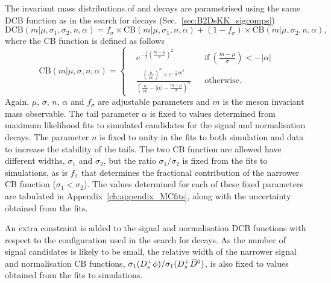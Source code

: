 The invariant mass distributions of \decay{\Bp}{\Dsp\phiz} and \decay{\Bp}{\Dsp\Dzb} decays are parametrised using the same DCB function as in the search for \decay{\Bp}{\Dsp\Kp\Km} decays (Sec.~\ref{sec:B2DsKK_sigcomps})
\begin{equation}
\text{DCB}(m|\mu,\sigma_1,\sigma_2,n,\alpha) = f_\sigma \times \text{CB}(m|\mu,\sigma_1,n,\alpha) + (1-f_\sigma) \times \text{CB}(m|\mu,\sigma_2,n,\alpha),
\label{eq:DoubleBD}
\end{equation}
where the CB function is defined as follows
\begin{equation}
\text{CB}(m|\mu,\sigma,n,\alpha) = \left \{
  \begin{aligned}
    &e^{-\frac{1}{2} \left(\frac{m-\mu}{\sigma}\right)^2} && \text{if}\ \left(\frac{m-\mu}{\sigma}\right) < -|\alpha|\\
    &\frac{\left(\frac{n}{|\alpha|}\right)^n\times e ^{-\frac{1}{2}|\alpha|^2} }{\left(\frac{n}{|\alpha|}-|\alpha| - \frac{m-\mu}{\sigma}\right)^n} && \text{otherwise.}
  \end{aligned} \right.
\end{equation}
Again, $\mu$, $\sigma$, $n$, $\alpha$ and $f_{\sigma}$ are adjustable parameters and $m$ is the \B meson invariant mass observable.
The tail parameter $\alpha$ is fixed to values determined from maximum likelihood fits to simulated candidates for the signal and normalisation decays. The parameter $n$ is fixed to unity in the fits to both simulation and data to increase the stability of the tails.     
The two CB function are allowed have different widths, $\sigma_{1}$ and $\sigma_{2}$, but the ratio $\sigma_{1}/\sigma_{2}$ is fixed from the fits to simulations, as is $f_{\sigma}$ that determines the fractional contribution of the narrower CB function ($\sigma_{1}<\sigma_{2}$). The values determined for each of these fixed parameters are tabulated in Appendix~\ref{ch:appendix_MCfits}, along with the uncertainty obtained from the fits.

An extra constraint is added to the signal and normalisation DCB functions with respect to the configuration used in the search for \decay{\Bp}{\Dsp\Kp\Km} decays. As the number of signal candidates is likely to be small, the relative width of the narrower signal and normalisation CB functions, $\sigma_{1}({{D}^+_{s}}\phi) / \sigma_{1}({{D}^+_{s}}{{\kern 0.2em\overline{\kern -0.2em D}{}}{}^0})$, is also fixed to values obtained from the fits to simulations. 


